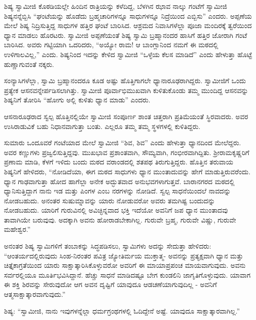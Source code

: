  ಶಿಷ್ಯ ಸ್ವಾಮೀಜಿ ಕೊಠಡಿಯಲ್ಲೇ ಹಿಂದಿನ ರಾತ್ರಿಯನ್ನು ಕಳೆದಿದ್ದ, ಬೆಳಗಿನ ಝಾವ ನಾಲ್ಕು ಗಂಟೆಗೆ ಸ್ವಾಮೀಜಿ ಶಿಷ್ಯನನ್ನೆಬ್ಬಿಸಿ “ಘಂಟೆಯನ್ನು ಹೊಡೆದು ಬ್ರಹ್ಮಚಾರಿಗಳನ್ನೂ ಸಾಧುಗಳನ್ನೂ ನಿದ್ರೆಯಿಂದ ಎಬ್ಬಿಸು” ಎಂದರು. ಅಪ್ಪಣೆಯ ಮೇಲೆ ಶಿಷ್ಯ ನಿದ್ರಿಸುತ್ತಿದ್ದ ಸಾಧುಗಳ ಹತ್ತಿರ ಘಂಟೆ ಬಾರಿಸಿದ. ಆಶ್ರಮದ ನಿವಾಸಿಗಳೆಲ್ಲಾ ಪೂಜಾ ಮಂದಿರಕ್ಕೆ ತ್ವರೆಯಿಂದ ಧ್ಯಾನ ಮಾಡಲು ಹೊರಟರು. ಸ್ವಾಮೀಜಿ ಅಪ್ಪಣೆಯಂತೆ ಶಿಷ್ಯ ಸ್ವಾಮಿ ಬ್ರಹ್ಮಾನಂದರ ಹಾಸಿಗೆ ಹತ್ತಿರ ಜೋರಾಗಿ ಗಂಟೆ ಬಾರಿಸಿದ. ಅವರು ಗಟ್ಟಿಯಾಗಿ ಒದರಿದರು, “ಅಯ್ಯೋ ರಾಮ! ಆ ಬಾಂಗ್ಲಾನಿಂದ ನಮಗೆ ಈ ಮಠದಲ್ಲಿ ಉಳಿಗಾಲವಿಲ್ಲ,” ಎಂದು. ಶಿಷ್ಯನಿಂದ ಇದನ್ನು ಕೇಳಿದ ಸ್ವಾಮೀಜಿ “ಒಳ್ಳೆಯ ಕೆಲಸ ಮಾಡಿದೆ” ಎಂದು ಹೇಳುತ್ತಾ ಹೊಟ್ಟೆ ಹುಣ್ಣಾಗುವಂತೆ ನಕ್ಕರು. 

 ಸಂನ್ಯಾಸಿಗಳೆಲ್ಲಾ, ಸ್ವಾಮಿ ಬ್ರಹ್ಮಾನಂದರೂ ಕೂಡ ಅಷ್ಟು ಹೊತ್ತಿಗಾಗಲೇ ಧ್ಯಾನಾರೂಢರಾಗಿದ್ದರು. ಸ್ವಾಮೀಜಿಗೆ ಒಂದು ಪ್ರತ್ಯೇಕ ಆಸನವನ್ನೇರ್ಪಡಿಸಲಾಗಿತ್ತು. ಸ್ವಾಮೀಜಿ ಪೂರ್ವಾಭಿಮುಖವಾಗಿ ಕುಳಿತುಕೊಂಡು ತಮ್ಮ ಮುಂದಿದ್ದ ಆಸನವನ್ನು ಶಿಷ್ಯನಿಗೆ ತೋರಿಸಿ “ಹೋಗು ಅಲ್ಲಿ ಕುಳಿತು ಧ್ಯಾನ ಮಾಡು” ಎಂದರು. 

 ಆಸನಾರೂಢರಾದ ಸ್ವಲ್ಪ ಹೊತ್ತಿನಲ್ಲಿಯೇ ಸ್ವಾಮೀಜಿ ಸಂಪೂರ್ಣ ಶಾಂತ ಚಿತ್ತರಾಗಿ ಪ್ರತಿಮೆಯಂತೆ ಸ್ಥಿರವಾದರು. ಅವರ ಉಸಿರಾಡುವಿಕೆ ಬಹು ನಿಧಾನವಾಗುತ್ತಾ ಬಂತು. ಎಲ್ಲರೂ ತಮ್ಮ ತಮ್ಮ ಸ್ಥಳಗಳಲ್ಲಿ ಕುಳಿತಿದ್ದರು. 

 ಸುಮಾರು ಒಂದೂವರೆ ಗಂಟೆಯಾದ ಮೇಲೆ ಸ್ವಾಮೀಜಿ “ಶಿವ, ಶಿವ” ಎಂದು ಹೇಳುತ್ತಾ ಧ್ಯಾನದಿಂದ ಮೇಲೆದ್ದರು. ಅವರ ಕಣ್ಣುಗಳು ಪ್ರಜ್ವಲಿಸುತ್ತಿದ್ದವು. ಮುಖಭಾವ ಪ್ರಶಾಂತವಾಗಿ, ಸೌಮ್ಯವಾಗಿ, ಗಂಭೀರವಾಗಿದ್ದಿತು. ಶ‍್ರೀರಾಮಕೃಷ್ಣರಿಗೆ ಪ್ರಣಾಮ ಮಾಡಿ, ಕೆಳಗೆ ಇಳಿದು ಬಂದು ಮಠದ ವರಾಂಡದಲ್ಲಿ ಶತಪಥ ತಿರುಗುತ್ತಿದ್ದರು. ಹೊತ್ತಿನ ತರುವಾಯ ಶಿಷ್ಯನಿಗೆ ಹೇಳಿದರು, “ನೋಡಿದೆಯಾ, ಈಗ ಮಠದ ಸಾಧುಗಳು ಧ್ಯಾನ ಮುಂತಾದುವನ್ನು ಹೇಗೆ ಮಾಡುತ್ತಿರುವರೆಂದು. ಧ್ಯಾನ ಗಾಢವಾಗುತ್ತಾ ಹೋದ ಹಾಗೆಲ್ಲಾ ಅನೇಕ ಅದ್ಭುತವಾದ ಅನುಭವಗಳಾಗುತ್ತವೆ. ಬಾರಾನಗರದ ಮಠದಲ್ಲಿ ಧ್ಯಾನಿಸುತ್ತಿದ್ದಾಗ ನಾನು ಇಡ ಮತ್ತು ಪಿಂಗಳ ಎಂಬ ನರಗಳನ್ನು ನೋಡಿದೆ. ಸ್ವಲ್ಪ ಸಾಧನೆಯಿಂದಲೆ ನಾವದನ್ನು ನೋಡಬಹುದು. ಅನಂತರ ಸುಷುಮ್ನಾವನ್ನು ಯಾರು ನೋಡುವರೋ ಅವರು ತಮಗಿಷ್ಟ ಬಂದುದನ್ನು ನೋಡಬಹುದು. ಯಾರಿಗೆ ಗುರುವಿನಲ್ಲಿ ಅವಿಚ್ಛಿನ್ನವಾದ ಭಕ್ತಿ ಇದೆಯೋ ಅವನಿಗೆ ಜಪ ಧ್ಯಾನ ಮುಂತಾದವು ತಾವಾಗಿಯೇ ಬರುವುವು. ಅದಕ್ಕಾಗಿ ಅವನು ಹೋರಾಡಬೇಕಾಗಿಲ್ಲ. ಗುರುವೇ ಬ್ರಹ್ಮ, ಗುರುವೇ ವಿಷ್ಣು, ಗುರುವೇ ಮಹೇಶ್ವರ.” 

 ಅನಂತರ ಶಿಷ್ಯ ಸ್ವಾಮಿಗಳಿಗೆ ತಂಬಾಕನ್ನು ಸಿದ್ಧಪಡಿಸಲು, ಸ್ವಾಮಿಗಳು ಅದನ್ನು ಸೇದುತ್ತಾ ಹೇಳಿದರು: “ಆಂತರ್ಯದಲ್ಲಿರುವುದು ಸಿಂಹ-ನಿರಂತರ ಪವಿತ್ರ ಜ್ಯೋತಿರ್ಮಯ ಮುಕ್ತಾತ್ಮ- ಅವನನ್ನು ಪ್ರತ್ಯಕ್ಷವಾಗಿ ಧ್ಯಾನ ಮತ್ತು ಚಿತ್ತೈಕಾಗ್ರತೆಯಿಂದ ಯಾರು ಸಾಕ್ಷಾತ್ಕಾರಿಸಿಕೊಳ್ಳುವರೋ ಅವರಿಗೆ ಈ ಮಾಯಾಪ್ರಪಂಚ ಮಾಯವಾಗುವುದು. ಅವನು ಸರ್ವರಲ್ಲಿಯೂ ಮೂರ್ತಿಭವಿಸಿದ್ದಾನೆ. ಹೆಚ್ಚು ಸಾಧನೆ ಮಾಡಿದಷ್ಟೂ ಬೇಗ ಕುಂಡಲಿನಿ ಜಾಗೃತಿಗೊಳ್ಳುವುದು. ಯಾವಾಗ ಈ ಶಕ್ತಿ ಶಿರವನ್ನು ಸೇರುವುದೋ ಆಗ ಅವನ ದೃಷ್ಟಿಗೆ ಯಾವುದೂ ಆಡಚಣೆಯಾಗುವುದಿಲ್ಲ - ಅವನಿಗೆ ಆತ್ಮಸಾಕ್ಷಾತ್ಕಾರವಾಗುವುದು.” 

 ಶಿಷ್ಯ: “ಸ್ವಾಮೀಜಿ, ನಾನು ಇವುಗಳನ್ನೆಲ್ಲಾ ಧರ್ಮಗ್ರಂಥಗಳಲ್ಲಿ ಓದಿದ್ದೇನೆ ಅಷ್ಟೆ. ಯಾವುದೂ ಸಾಕ್ಷಾತ್ಕಾರವಾಗಿಲ್ಲ.” 

